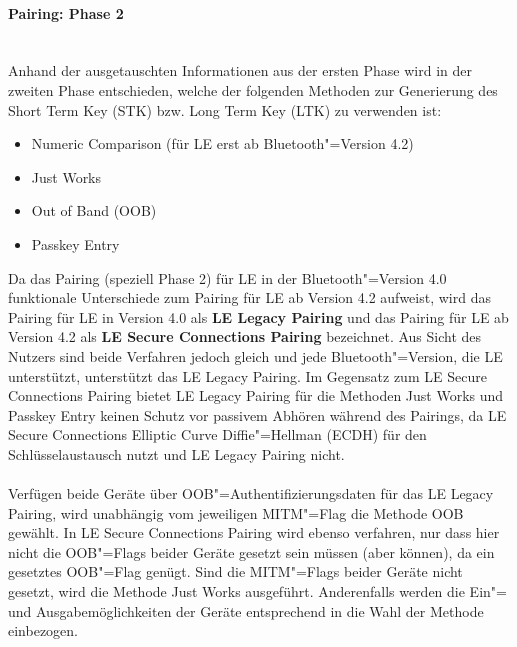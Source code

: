 \paragraph{Pairing: Phase 2} \mbox{} \vspace{0.2cm} \\
Anhand der ausgetauschten Informationen aus der ersten Phase wird in der zweiten Phase entschieden, welche der folgenden Methoden zur Generierung des Short Term Key (STK) bzw. Long Term Key (LTK) zu verwenden ist:
\begin{itemize}
    \item{Numeric Comparison (für LE erst ab Bluetooth"=Version 4.2)}
    \item{Just Works}
    \item{Out of Band (OOB)}
    \item{Passkey Entry}
\end{itemize}
Da das Pairing (speziell Phase 2) für LE in der Bluetooth"=Version 4.0 funktionale Unterschiede zum Pairing für LE ab Version 4.2 aufweist, wird das Pairing für LE in Version 4.0 als \textbf{LE Legacy Pairing} und das Pairing für LE ab Version 4.2 als \textbf{LE Secure Connections Pairing} bezeichnet. Aus Sicht des Nutzers sind beide Verfahren jedoch gleich und jede Bluetooth"=Version, die LE unterstützt, unterstützt das LE Legacy Pairing. Im Gegensatz zum LE Secure Connections Pairing bietet LE Legacy Pairing für die Methoden Just Works und Passkey Entry keinen Schutz vor passivem Abhören während des Pairings, da LE Secure Connections Elliptic Curve Diffie"=Hellman (ECDH) für den Schlüsselaustausch nutzt und LE Legacy Pairing nicht. \cite{BtSpec4.2_248}
\\\\
Verfügen beide Geräte über OOB"=Authentifizierungsdaten für das LE Legacy Pairing, wird unabhängig vom jeweiligen MITM"=Flag die Methode OOB gewählt. In LE Secure Connections Pairing wird ebenso verfahren, nur dass hier nicht die OOB"=Flags beider Geräte gesetzt sein müssen (aber können), da ein gesetztes OOB"=Flag genügt. Sind die MITM"=Flags beider Geräte nicht gesetzt, wird die Methode Just Works ausgeführt. Anderenfalls werden die Ein"= und Ausgabemöglichkeiten der Geräte entsprechend \cite{BtSpec4.2_tab_2302-2303} in die Wahl der Methode einbezogen.

